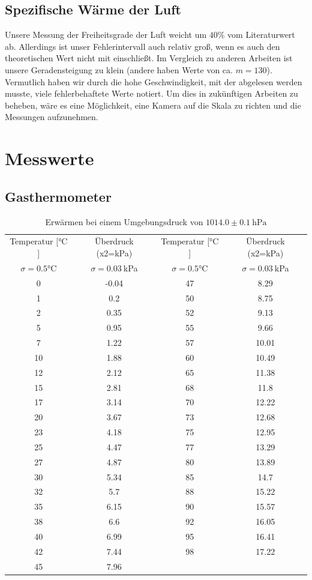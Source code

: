 \documentclass[12pt,a4paper,titlepage,headinclude,bibtotoc]{scrartcl}
\begin{document}
\subsection{Spezifische Wärme der Luft}
Unsere Messung der Freiheitsgrade der Luft weicht um $40\%$ vom Literaturwert ab.
Allerdings ist unser Fehlerintervall auch relativ groß, wenn es auch den theoretischen Wert nicht mit einschließt.
Im Vergleich zu anderen Arbeiten ist unsere Geradensteigung zu klein (andere haben Werte von ca. $m=130$).
Vermutlich haben wir durch die hohe Geschwindigkeit, mit der abgelesen werden musste, viele fehlerbehaftete Werte notiert.
Um dies in zukünftigen Arbeiten zu beheben, wäre es eine Möglichkeit, eine Kamera auf die Skala zu richten und die Messungen aufzunehmen.

\section{Messwerte}
\label{sec:mess}
\subsection{Gasthermometer}
\begin{table}[!htb]
	\centering	
	\begin{tabular}{|c|c||c|c|}
	\hline
	Temperatur [$\si{\celsius}$]  & Überdruck (x2=kPa)&
	Temperatur [$\si{\celsius}$]  & Überdruck (x2=kPa)\\
	$\sigma=0.5\si{\celsius}$ & $\sigma=0.03~$kPa &
	$\sigma=0.5\si{\celsius}$ & $\sigma=0.03~$kPa \\
	\hline
	0	&	-0.04	&	47	&	8.29	\\
	1	&	0.2	&	50	&	8.75	\\
	2	&	0.35	&	52	&	9.13	\\
	5	&	0.95	&	55	&	9.66	\\
	7	&	1.22	&	57	&	10.01	\\
	10	&	1.88	&	60	&	10.49	\\
	12	&	2.12	&	65	&	11.38	\\
	15	&	2.81	&	68	&	11.8	\\
	17	&	3.14	&	70	&	12.22	\\
	20	&	3.67	&	73	&	12.68	\\
	23	&	4.18	&	75	&	12.95	\\
	25	&	4.47	&	77	&	13.29	\\
	27	&	4.87	&	80	&	13.89	\\
	30	&	5.34	&	85	&	14.7	\\
	32	&	5.7	&	88	&	15.22	\\
	35	&	6.15	&	90	&	15.57	\\
	38	&	6.6	&	92	&	16.05	\\
	40	&	6.99	&	95	&	16.41	\\
	42	&	7.44	&	98	&	17.22	\\
	45	&	7.96	&		&		\\
	\hline
	\end{tabular}
	\caption{Erwärmen bei einem Umgebungsdruck von $1014.0\pm 0.1~\si{\hecto\pascal}$}
\end{table}
\end{document}
